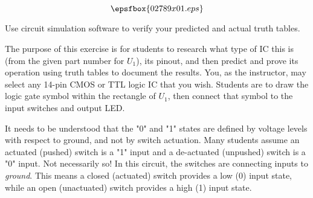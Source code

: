 

$$\epsfbox{02789x01.eps}$$

\vfil \eject






Use circuit simulation software to verify your predicted and actual truth tables.







The purpose of this exercise is for students to research what type of IC this is (from the given part number for $U_1$), its pinout, and then predict and prove its operation using truth tables to document the results.  You, as the instructor, may select any 14-pin CMOS or TTL logic IC that you wish.  Students are to draw the logic gate symbol within the rectangle of $U_1$, then connect that symbol to the input switches and output LED.

It needs to be understood that the "0" and "1" states are defined by voltage levels with respect to ground, and not by switch actuation.  Many students assume an actuated (pushed) switch is a "1" input and a de-actuated (unpushed) switch is a "0" input.  Not necessarily so!  In this circuit, the switches are connecting inputs to {\it ground}.  This means a closed (actuated) switch provides a low (0) input state, while an open (unactuated) switch provides a high (1) input state.




